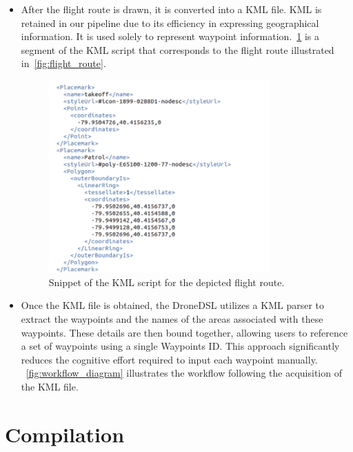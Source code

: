 \begin{itemize}
    \item After the flight route is drawn, it is converted into a KML file. KML is retained in our pipeline due to its efficiency in expressing geographical information. It is used solely to represent waypoint information.~\ref{fig:kml_script} is a segment of the KML script that corresponds to the flight route illustrated in~\ref{fig:flight_route}.
    \begin{figure}[H] %
        \centering %
        \includegraphics[width=0.8\textwidth]{Pictures/pre_kml.PNG}
        \caption{Snippet of the KML script for the depicted flight route.}
        \label{fig:kml_script}
    \end{figure}
    \item Once the KML file is obtained, the DroneDSL utilizes a KML parser to extract the waypoints and the names of the areas associated with these waypoints. These details are then bound together, allowing users to reference a set of waypoints using a single Waypoints ID. This approach significantly reduces the cognitive effort required to input each waypoint manually. ~\ref{fig:workflow_diagram} illustrates the workflow following the acquisition of the KML file.
\end{itemize}


\section{Compilation}
